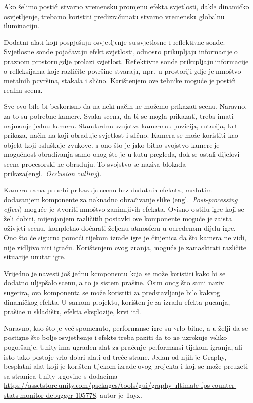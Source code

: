 Ako želimo postići stvarno vremensku promjenu efekta svjetlosti, dakle dinamičko osvjetljenje, trebamo koristiti predizračunatu stvarno vremensku globalnu iluminaciju. 

Dodatni alati koji pospješuju osvjetljenje su svjetlosne i reflektivne sonde. Svjetlosne sonde pojačavaju efekt svjetlosti, odnosno prikupljaju informacije o praznom prostoru gdje prolazi svjetlost. Reflektivne sonde prikupljaju informacije o refleksijama koje različite površine stvaraju, npr.~u prostoriji gdje je mnoštvo metalnih površina, stakala i slično. Korištenjem ove tehnike moguće je postići realnu scenu.

Sve ovo bilo bi beskorisno da na neki način ne možemo prikazati scenu. Naravno, za to su potrebne kamere. Svaka scena, da bi se mogla prikazati, treba imati najmanje jednu kameru. Standardna svojstva kamere su pozicija, rotacija, kut prikaza, način na koji obrađuje svjetlost i slično. Kamera se može koristiti kao objekt koji osluškuje zvukove, a ono što je jako bitno svojstvo kamere je mogućnost obrađivanja samo onog što je u kutu pregleda, dok se ostali dijelovi scene procesorski ne obrađuju. To svojstvo se naziva blokada prikaza(engl.~\textit{Occlusion culling}). 

Kamera sama po sebi prikazuje scenu bez dodatnih efekata, međutim dodavanjem komponente za naknadno obrađivanje slike (engl.~\textit{Post-processing effect}) moguće je stvoriti mnoštvo zanimljivih efekata. Ovisno o stilu igre koji se želi dobiti, mijenjanjem različitih postavki ove komponente moguće je zaista oživjeti scenu, kompletno dočarati željenu atmosferu u određenom dijelu igre. Ono što će sigurno pomoći tijekom izrade igre je činjenica da što kamera ne vidi, nije vidljivo niti igraču. Korištenjem ovog znanja, moguće je zamaskirati različite situacije unutar igre.

Vrijedno je navesti još jednu komponentu koja se može koristiti kako bi se dodatno uljepšalo scenu, a to je sistem prašine. Osim onog što sami naziv sugerira, ova komponenta se može koristiti za predstavljanje bilo kakvog dinamičkog efekta. U samom projektu, korišten je za izradu efekta pucanja, prašine u skladištu, efekta eksplozije, krvi itd.

Naravno, kao što je već spomenuto, performanse igre su vrlo bitne, a u želji da se postigne što bolje osvjetljenje i efekte treba paziti da to ne uzrokuje veliko pogoršanje. Unity ima ugrađen alat za praćenje performansi tijekom igranja, ali isto tako postoje vrlo dobri alati od treće strane. Jedan od njih je Graphy, besplatni alat koji je korišten tijekom izrade ovog projekta i koji se može preuzeti sa stranica Unity trgovine s dodacima \url{https://assetstore.unity.com/packages/tools/gui/graphy-ultimate-fps-counter-stats-monitor-debugger-105778}, autor je Tayx.

